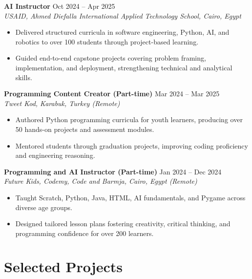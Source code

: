 \documentclass[10pt,letterpaper]{article}
\begin{document}
\textbf{AI Instructor} \hfill Oct 2024 -- Apr 2025\\
\textit{USAID, Ahmed Diefalla International Applied Technology School, Cairo, Egypt}
\begin{itemize}
\item Delivered structured curricula in software engineering, Python, AI, and robotics to over 100 students through project-based learning.
\item Guided end-to-end capstone projects covering problem framing, implementation, and deployment, strengthening technical and analytical skills.
\end{itemize}

\textbf{Programming Content Creator (Part-time)} \hfill Mar 2024 -- Mar 2025\\
\textit{Tweet Kod, Karabuk, Turkey (Remote)}
\begin{itemize}
\item Authored Python programming curricula for youth learners, producing over 50 hands-on projects and assessment modules.
\item Mentored students through graduation projects, improving coding proficiency and engineering reasoning.
\end{itemize}

\textbf{Programming and AI Instructor (Part-time)} \hfill Jan 2024 -- Dec 2024\\
\textit{Future Kids, Codemy, Code and Barmja, Cairo, Egypt (Remote)}
\begin{itemize}
\item Taught Scratch, Python, Java, HTML, AI fundamentals, and Pygame across diverse age groups.
\item Designed tailored lesson plans fostering creativity, critical thinking, and programming confidence for over 200 learners.
\end{itemize}

\section{Selected Projects}
\end{document}
